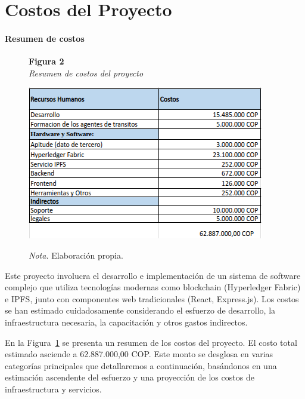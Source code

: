 \section{Costos del Proyecto}
\paragraph{Resumen de costos}

\begin{figure}[htbp]
    \begin{flushleft}
        \textbf{Figura 2}\\[2em]
        \textit{Resumen de costos del proyecto}
    \end{flushleft}
    \vspace{1em}
    \centering
    \includegraphics[width=\textwidth]{Images/costos1.png}
    \vspace{2em}
    \begin{flushleft}
        \textit{Nota.} Elaboración propia.
    \end{flushleft}
    \label{fig:costos1}
\end{figure}

Este proyecto involucra el desarrollo e implementación de un sistema de software complejo que utiliza tecnologías modernas como blockchain (Hyperledger Fabric) e IPFS, junto con componentes web tradicionales (React, Express.js). Los costos se han estimado cuidadosamente considerando el esfuerzo de desarrollo, la infraestructura necesaria, la capacitación y otros gastos indirectos. 

En la Figura~\ref{fig:costos1} se presenta un resumen de los costos del proyecto. El costo total estimado asciende a 62.887.000,00 COP. Este monto se desglosa en varias categorías principales que detallaremos a continuación, basándonos en una estimación ascendente del esfuerzo y una proyección de los costos de infraestructura y servicios. 

